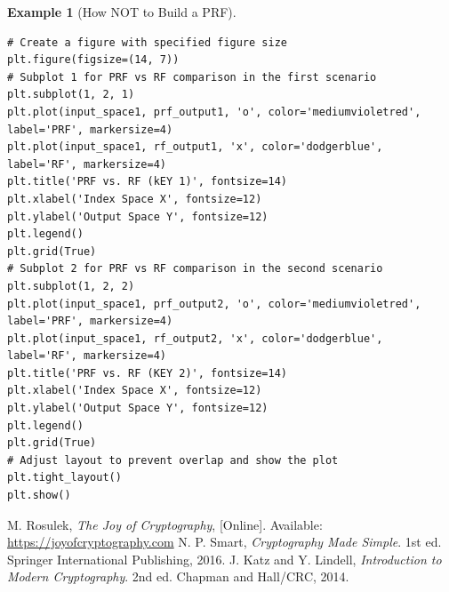 \documentclass[12pt,openany]{book}
\theoremstyle{definition}
\newtheorem{example}{Example}[chapter]
\begin{document}
\begin{example}[How NOT to Build a PRF]
\begin{lstlisting}[style=sage]
# Create a figure with specified figure size
plt.figure(figsize=(14, 7))
# Subplot 1 for PRF vs RF comparison in the first scenario
plt.subplot(1, 2, 1)
plt.plot(input_space1, prf_output1, 'o', color='mediumvioletred', label='PRF', markersize=4)
plt.plot(input_space1, rf_output1, 'x', color='dodgerblue', label='RF', markersize=4)
plt.title('PRF vs. RF (kEY 1)', fontsize=14)
plt.xlabel('Index Space X', fontsize=12)
plt.ylabel('Output Space Y', fontsize=12)
plt.legend()
plt.grid(True)
# Subplot 2 for PRF vs RF comparison in the second scenario
plt.subplot(1, 2, 2)
plt.plot(input_space1, prf_output2, 'o', color='mediumvioletred', label='PRF', markersize=4)
plt.plot(input_space1, rf_output2, 'x', color='dodgerblue', label='RF', markersize=4)
plt.title('PRF vs. RF (KEY 2)', fontsize=14)
plt.xlabel('Index Space X', fontsize=12)
plt.ylabel('Output Space Y', fontsize=12)
plt.legend()
plt.grid(True)
# Adjust layout to prevent overlap and show the plot
plt.tight_layout()
plt.show()
	\end{lstlisting}
\end{example}

	\newpage
	\begin{thebibliography}{9}
		M. Rosulek, \textit{The Joy of Cryptography}, [Online]. Available: \url{https://joyofcryptography.com}
		N. P. Smart, \textit{Cryptography Made Simple}. 1st ed. Springer International Publishing, 2016.
		J. Katz and Y. Lindell, \textit{Introduction to Modern Cryptography}. 2nd ed. Chapman and Hall/CRC, 2014.	
\end{thebibliography}

\end{document}
